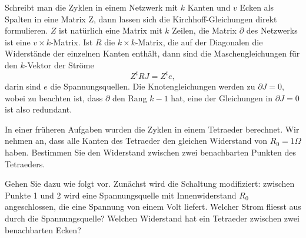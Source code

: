 Schreibt man die Zyklen in einem Netzwerk mit $k$ Kanten und $v$ Ecken
als Spalten in eine Matrix Z,
dann lassen sich die Kirchhoff-Gleichungen direkt formulieren.
$Z$ ist natürlich eine Matrix mit $k$ Zeilen, die Matrix $\partial$
des Netzwerks ist eine $v\times k$-Matrix.
Ist $R$ die $k\times k$-Matrix, die auf der Diagonalen die Widerstände der
einzelnen Kanten enthält, dann sind die Maschengleichungen für den
$k$-Vektor der Ströme 
\[
Z^tRJ=Z^te,
\]
darin sind $e$ die Spannungsquellen.
Die Knotengleichungen werden zu $\partial J=0$, wobei zu beachten ist,
dass $\partial$ den Rang $k-1$ hat, eine der Gleichungen in $\partial J=0$ 
ist also redundant.

In einer früheren Aufgaben wurden die Zyklen in einem Tetraeder berechnet.
Wir nehmen an, dass alle Kanten des Tetraeder den gleichen Widerstand von
$R_0=1\Omega$ haben. Bestimmen Sie den Widerstand zwischen zwei benachbarten
Punkten des Tetraeders.


\begin{hinweis}
Gehen Sie dazu wie folgt vor.
Zunächst wird die Schaltung modifiziert: zwischen Punkte 1 und 2 wird eine
Spannungsquelle mit Innenwiderstand $R_0$ angeschlossen,
die eine Spannung von einem Volt liefert.
Welcher Strom fliesst aus durch die Spannungsquelle? Welchen Widerstand
hat ein Tetraeder zwischen zwei benachbarten Ecken?
\end{hinweis}

